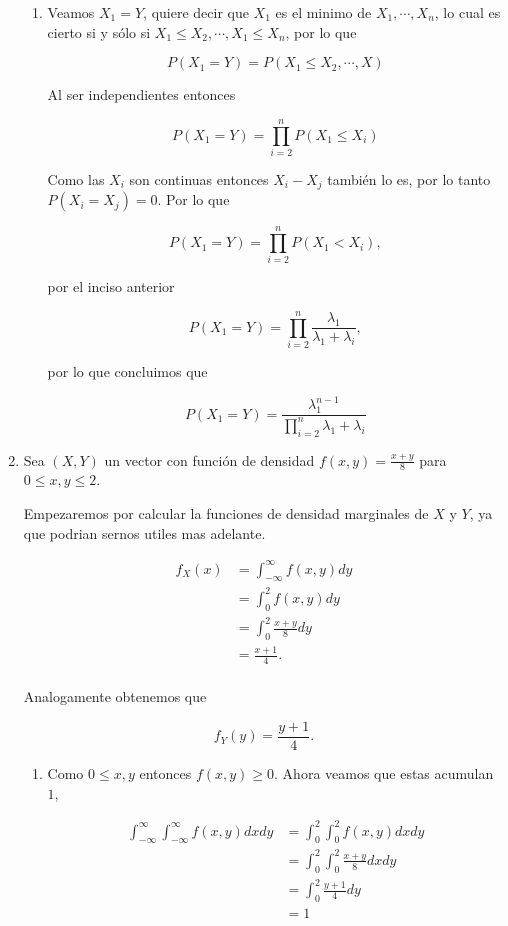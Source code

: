 \documentclass[letterpaper]{article}
\theoremstyle{definition}
\theoremstyle{lemathm}
\theoremstyle{lemademthm}
\begin{document}
\begin{enumerate}
\begin{enumerate}
			\item Veamos $X_1 = Y$, quiere decir que $X_1$ es el minimo de $X_1,\cdots,X_n$, lo cual es cierto si y sólo si $X_1 \leq X_2,\cdots, X_1 \leq X_n$, por lo que
			
			\[P(X_1 = Y) = P(X_1 \leq X_2,\cdots, X)\]
			
			Al ser independientes entonces
			
			\[P(X_1 = Y) = \prod_{i=2}^{n}P(X_1 \leq X_i)\]

			Como las $X_i$ son continuas entonces $X_i - X_j$ también lo es, por lo tanto \linebreak $P(X_i = X_j) = 0$. Por lo que 

			\[P(X_1 = Y) = \prod_{i=2}^{n}P(X_1 < X_i),\]
			
			por el inciso anterior

			\[P(X_1 = Y) = \prod_{i=2}^{n}\frac{\lambda_1}{\lambda_1 + \lambda_i},\]

			por lo que concluimos que

			\[P(X_1 = Y) = \frac{\lambda_1^{n-1}}{\prod_{i=2}^{n}\lambda_1 + \lambda_i}\]

		\end{enumerate}

		\item Sea $(X,Y)$ un vector con función de densidad $f(x,y) = \frac{x+y}{8}$ para $0 \leq x, y \leq 2$.
		
		Empezaremos por calcular la funciones de densidad marginales de $X$ y $Y$, ya que podrian sernos utiles mas adelante.

		\begin{align*}
			f_X(x) &= \int_{-\infty}^\infty f(x,y) dy\\
			&= \int_{0}^2 f(x,y) dy\\
			&= \int_{0}^2 \frac{x+y}{8} dy\\
			&= \frac{x+1}{4}.\\
		\end{align*}

		Analogamente obtenemos que

		\[f_Y(y) = \frac{y+1}{4}.\]

		\begin{enumerate}
			\item Como $0 \leq x, y$ entonces $f(x,y) \geq 0$. Ahora veamos que estas acumulan $1$,
			
			\begin{align*}
				\int_{-\infty}^\infty \int_{-\infty}^\infty f(x,y) dx dy &= \int_{0}^2 \int_{0}^2 f(x,y) dx dy\\
				&= \int_{0}^2 \int_{0}^2 \frac{x+y}{8} dx dy\\
				&= \int_{0}^2 \frac{y+1}{4}dy\\
				&= 1\\
			\end{align*}


\end{enumerate}
\end{enumerate}
\end{document}
